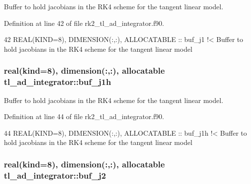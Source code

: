 Buffer to hold jacobians in the R\+K4 scheme for the tangent linear model. 



Definition at line 42 of file rk2\+\_\+tl\+\_\+ad\+\_\+integrator.\+f90.


\begin{DoxyCode}
42   \textcolor{keywordtype}{REAL(KIND=8)}, \textcolor{keywordtype}{DIMENSION(:,:)}, \textcolor{keywordtype}{ALLOCATABLE} :: buf\_j1\textcolor{comment}{ !< Buffer to hold jacobians in the RK4 scheme for the
       tangent linear model}
\end{DoxyCode}
\subsubsection[{\texorpdfstring{buf\+\_\+j1h}{buf_j1h}}]{\setlength{\rightskip}{0pt plus 5cm}real(kind=8), dimension(\+:,\+:), allocatable tl\+\_\+ad\+\_\+integrator\+::buf\+\_\+j1h\hspace{0.3cm}{\ttfamily [private]}}\hypertarget{namespacetl__ad__integrator_a4ae89c821542838ecfc5ac3b7a76d5c1}{}\label{namespacetl__ad__integrator_a4ae89c821542838ecfc5ac3b7a76d5c1}


Buffer to hold jacobians in the R\+K4 scheme for the tangent linear model. 



Definition at line 44 of file rk2\+\_\+tl\+\_\+ad\+\_\+integrator.\+f90.


\begin{DoxyCode}
44   \textcolor{keywordtype}{REAL(KIND=8)}, \textcolor{keywordtype}{DIMENSION(:,:)}, \textcolor{keywordtype}{ALLOCATABLE} :: buf\_j1h\textcolor{comment}{ !< Buffer to hold jacobians in the RK4 scheme for
       the tangent linear model}
\end{DoxyCode}
\subsubsection[{\texorpdfstring{buf\+\_\+j2}{buf_j2}}]{\setlength{\rightskip}{0pt plus 5cm}real(kind=8), dimension(\+:,\+:), allocatable tl\+\_\+ad\+\_\+integrator\+::buf\+\_\+j2\hspace{0.3cm}{\ttfamily [private]}}\hypertarget{namespacetl__ad__integrator_a0ce53a275fcb35f76e2b34ee8d8df1ca}{}\label{namespacetl__ad__integrator_a0ce53a275fcb35f76e2b34ee8d8df1ca}


